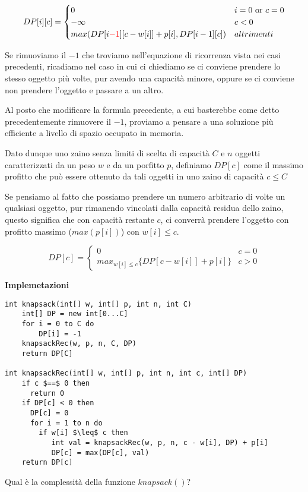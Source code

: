 \documentclass[../cheatSheetAlgoritmi.tex]{subfiles}
\begin{document}
\begin{equation*}
  	DP[i][c] =\begin{cases}
    	0 & \text{$i = 0$ or $c = 0$}\\
    	-\infty & \text{$c < 0$}\\
    	max(DP[i \textcolor{red}{-1}][c-w[i]]+p[i], DP[i-1][c]) & \text{$altrimenti$}
  	\end{cases}
\end{equation*} 

Se rimuoviamo il $-1$ che troviamo nell'equazione di ricorrenza vista nei casi precedenti, ricadiamo nel caso in cui ci chiediamo se ci conviene prendere lo stesso oggetto più volte, pur avendo una capacità minore, oppure se ci conviene non prendere l'oggetto e passare a un altro. 

Al posto che modificare la formula precedente, a cui basterebbe come detto precedentemente rimuovere il $-1$, proviamo a pensare a una soluzione più efficiente a livello di spazio occupato in memoria. 

\bigskip

Dato dunque uno zaino senza limiti di scelta di capacità $C$ e $n$ oggetti caratterizzati da un peso $w$ e da un porfitto $p$, definiamo $DP[c]$ come il massimo profitto che può essere ottenuto da tali oggetti in uno zaino di capacità $c \leq C$

\bigskip

Se pensiamo al fatto che possiamo prendere un numero arbitrario di volte un qualsiasi oggetto, pur rimanendo vincolati dalla capacità residua dello zaino, questo significa che con capacità restante $c$, ci converrà prendere l'oggetto con profitto massimo ($max(p[i])$) con $w[i] \leq c$.

\begin{equation*}
  	DP[c] =\begin{cases}
    	0 & \text{$c = 0$}\\
    	max_{w[i] \leq c}\{DP[c-w[i]]+p[i]\} & \text{$c>0$}
  	\end{cases}
\end{equation*}

\bigskip

\textbf{Implemetazioni}
\begin{lstlisting}[caption= Knapsack zaino senza limiti]
int knapsack(int[] w, int[] p, int n, int C)
	int[] DP = new int[0...C]
	for i = 0 to C do
		DP[i] = -1
	knapsackRec(w, p, n, C, DP)
	return DP[C]
	
int knapsackRec(int[] w, int[] p, int n, int c, int[] DP)
	if c $==$ 0 then
	  return 0
	if DP[c] < 0 then
	  DP[c] = 0
	  for i = 1 to n do
	    if w[i] $\leq$ c then
	  	   int val = knapsackRec(w, p, n, c - w[i], DP) + p[i]
	   	   DP[c] = max(DP[c], val)
	return DP[c]
\end{lstlisting}
Qual è la complessità della funzione $knapsack()$?
\end{document}
